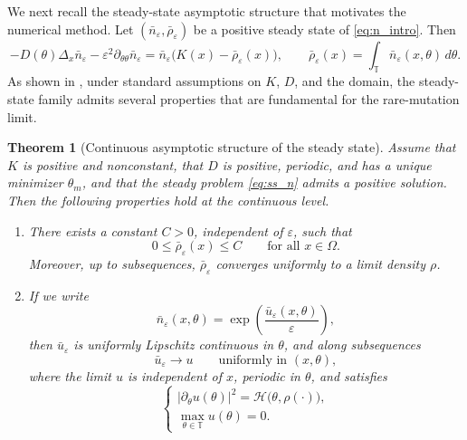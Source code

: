 \documentclass[11pt]{article}
\numberwithin{equation}{section}
\newtheorem{theorem}{Theorem}[section]
\begin{document}
We next recall the steady-state asymptotic structure that motivates the numerical method. Let \((\bar n_\varepsilon,\bar \rho_\varepsilon)\) be a positive steady state of \eqref{eq:n_intro}. Then
\begin{equation}\label{eq:ss_n}
-D(\theta)\Delta_x \bar n_\varepsilon
-\varepsilon^2\partial_{\theta\theta} \bar n_\varepsilon
=
\bar n_\varepsilon\bigl(K(x)-\bar\rho_\varepsilon(x)\bigr),
\qquad
\bar\rho_\varepsilon(x)=\int_{\mathbb T} \bar n_\varepsilon(x,\theta)\,d\theta.
\end{equation}
As shown in \cite{PerthameSouganidis}, under standard assumptions on \(K\), \(D\), and the domain, the steady-state family admits several properties that are fundamental for the rare-mutation limit.

\begin{theorem}[Continuous asymptotic structure of the steady state]\label{prop:continuous_structure}
Assume that \(K\) is positive and nonconstant, that \(D\) is positive, periodic, and has a unique minimizer \(\theta_m\), and that the steady problem \eqref{eq:ss_n} admits a positive solution. Then the following properties hold at the continuous level.
\begin{enumerate}
\item There exists a constant \(C>0\), independent of \(\varepsilon\), such that
\begin{equation}\label{eq:rho_continuous_bound}
0\le \bar\rho_\varepsilon(x)\le C
\qquad \text{for all } x\in\Omega.
\end{equation}
Moreover, up to subsequences, \(\bar\rho_\varepsilon\) converges uniformly to a limit density \(\rho\).

\item If we write
\begin{equation}\label{eq:u_log_transform}
\bar n_\varepsilon(x,\theta)=\exp\!\left(\frac{\bar u_\varepsilon(x,\theta)}{\varepsilon}\right),
\end{equation}
then \(\bar u_\varepsilon\) is uniformly Lipschitz continuous in \(\theta\), and along subsequences
\begin{equation}\label{eq:u_limit_uniform}
\bar u_\varepsilon \to u
\qquad \text{uniformly in } (x,\theta),
\end{equation}
where the limit \(u\) is independent of \(x\), periodic in \(\theta\), and satisfies
\begin{equation}\label{eq:HJ_limit}
\begin{cases}
|\partial_\theta u(\theta)|^2 = \mathcal H\bigl(\theta,\rho(\cdot)\bigr),\\[1mm]
\displaystyle \max_{\theta\in\mathbb T} u(\theta)=0.
\end{cases}
\end{equation}


\end{enumerate}
\end{theorem}
\end{document}
